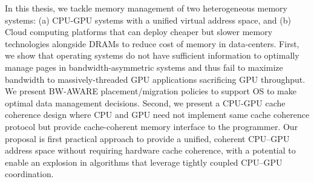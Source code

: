 In this thesis, we tackle memory management of two heterogeneous memory systems:
(a) CPU-GPU systems with a unified virtual address space, and (b) Cloud
computing platforms that can deploy cheaper but slower memory technologies
alongside DRAMs to reduce cost of memory in data-centers.
First, we show that operating systems do not have sufficient information to optimally
manage pages in bandwidth-asymmetric systems and thus fail to maximize
bandwidth to massively-threaded GPU applications sacrificing GPU
throughput. We present BW-AWARE placement/migration policies to support OS to
make optimal data management decisions. Second, we present a CPU-GPU cache coherence design where CPU and GPU need not
implement same cache coherence protocol but provide cache-coherent memory interface to
the programmer.
Our proposal is first practical approach
to provide a unified, coherent CPU--GPU address space without requiring hardware
cache coherence, with a potential to enable an explosion in algorithms that leverage tightly
coupled CPU--GPU coordination.
